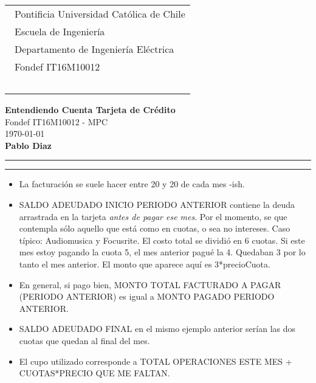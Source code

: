 \documentclass{article}
\begin{document}
\thispagestyle{empty}


\hspace*{2cm}
 \begin{tabular}{l}
  {\ Pontificia Universidad Católica de Chile}\\
  {\ Escuela de Ingeniería}\\
  {\ Departamento de Ingeniería Eléctrica}\\
  {\ Fondef IT16M10012 }\\
  {\  }\\
 \end{tabular}
 \hfill 
\vspace*{-0.2cm}
\begin{center}
{\Large\bf Entendiendo Cuenta Tarjeta de Crédito}\\
\vspace*{2mm}
{\Large Fondef IT16M10012 - MPC}\\
{\today{}}\\
\vspace*{1mm}
{\bf Pablo Diaz }\\
\vspace*{1mm}
\end{center}
\hrule\vspace*{2pt}\hrule
\setcounter{page}{1}
\begin{itemize}
\item La facturación se suele hacer entre 20 y 20 de cada mes -ish.
\item SALDO ADEUDADO INICIO PERIODO ANTERIOR contiene la deuda arrastrada en la tarjeta \emph{antes de pagar ese mes}. Por el momento, se que contempla {\color{red} sólo aquello que está como en cuotas, o sea no intereses.} Caso típico: Audiomusica y Focusrite. El costo total se dividió en 6 cuotas. Si {\color{red} este} mes estoy pagando la cuota 5, el mes {\color{red}anterior} pagué la 4. Quedaban 3 por lo tanto {\color{red} el mes anterior}. El monto que aparece aquí es {\color{red}3}*precioCuota. 
\item En general, si pago bien, MONTO TOTAL FACTURADO A PAGAR (PERIODO ANTERIOR) es igual a MONTO PAGADO PERIODO ANTERIOR.
\item SALDO ADEUDADO FINAL en el mismo ejemplo anterior serían las dos cuotas que quedan al final del mes.
\item El cupo utilizado corresponde a {\color{red}TOTAL OPERACIONES ESTE MES} + {\color{orange}CUOTAS*PRECIO QUE ME FALTAN}.
\end{itemize}
\end{document}
